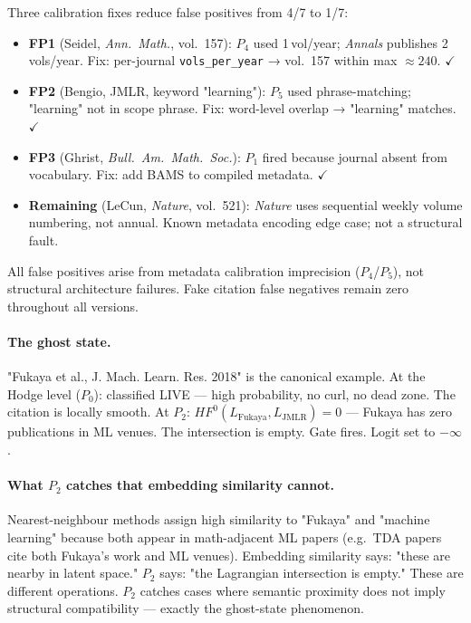 \documentclass[11pt,a4paper]{article}
\begin{document}
Three calibration fixes reduce false positives from 4/7 to 1/7:
\begin{itemize}[noitemsep]
  \item \textbf{FP1} (Seidel, \emph{Ann.\ Math.}, vol.\ 157):
        $P_4$ used 1\,vol/year; \emph{Annals} publishes 2\,vols/year.
        Fix: per-journal \texttt{vols\_per\_year} → vol.\ 157 within max $\approx 240$. $\checkmark$
  \item \textbf{FP2} (Bengio, JMLR, keyword "learning"):
        $P_5$ used phrase-matching; "learning" not in scope phrase.
        Fix: word-level overlap → "learning" matches. $\checkmark$
  \item \textbf{FP3} (Ghrist, \emph{Bull.\ Am.\ Math.\ Soc.}):
        $P_1$ fired because journal absent from vocabulary.
        Fix: add BAMS to compiled metadata. $\checkmark$
  \item \textbf{Remaining} (LeCun, \emph{Nature}, vol.\ 521):
        \emph{Nature} uses sequential weekly volume numbering, not annual.
        Known metadata encoding edge case; not a structural fault.
\end{itemize}
All false positives arise from metadata calibration imprecision ($P_4$/$P_5$),
not structural architecture failures.
Fake citation false negatives remain zero throughout all versions.

\paragraph{The ghost state.}
"Fukaya et al., J. Mach. Learn. Res. 2018" is the canonical example.
At the Hodge level ($P_0$): classified LIVE --- high probability,
no curl, no dead zone.
The citation is locally smooth.
At $P_2$: $HF^0(L_\text{Fukaya}, L_\text{JMLR}) = 0$ --- Fukaya
has zero publications in ML venues.
The intersection is empty.
Gate fires. Logit set to $-\infty$.

\paragraph{What $P_2$ catches that embedding similarity cannot.}
Nearest-neighbour methods assign high similarity to "Fukaya" and
"machine learning" because both appear in math-adjacent ML papers
(e.g.\ TDA papers cite both Fukaya's work and ML venues).
Embedding similarity says: "these are nearby in latent space."
$P_2$ says: "the Lagrangian intersection is empty."
These are different operations.
$P_2$ catches cases where semantic proximity does not imply
structural compatibility --- exactly the ghost-state phenomenon.
\end{document}
